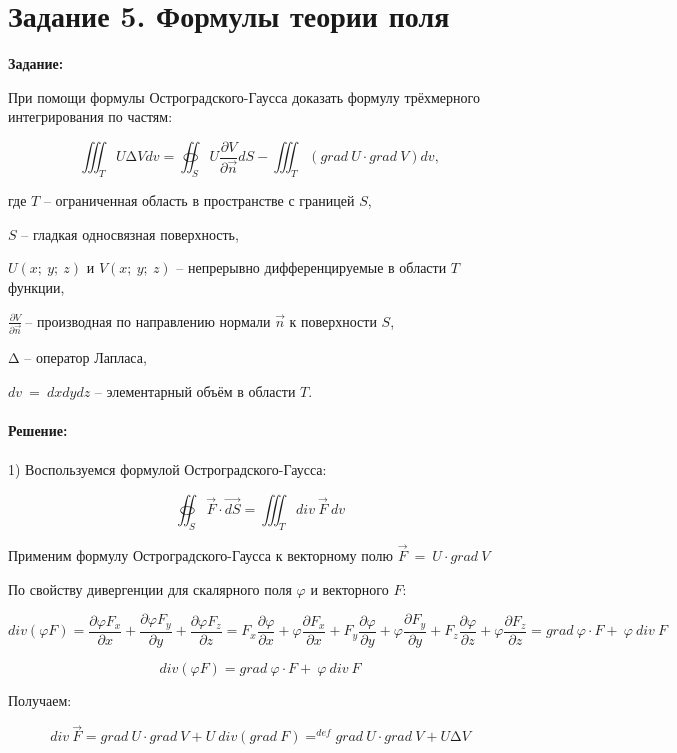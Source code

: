 \documentclass{article}
\begin{document}
\newpage
\section*{Задание 5. Формулы теории поля}
\textbf{
    Задание:
}

При помощи формулы Остроградского-Гаусса доказать формулу трёхмерного
интегрирования по частям:

\[\iiint_{T}^{\ }{U\mathrm{\Delta}V{dv}} = \oiint_{S}^{\ }{U\frac{\partial V}{\partial\overrightarrow{n}}dS} - \iiint_{T}^{\ }{(grad\ U \cdot grad\ V){dv}},\]

где \(T\) -- ограниченная область в пространстве с границей \(S\),

\(S\) -- гладкая односвязная поверхность,

\(U(x;\ y;\ z)\) и \(V(x;\ y;\ z)\) -- непрерывно дифференцируемые в
области \(T\) функции,

\(\frac{\partial V}{\partial\overrightarrow{n}}\ \)-- производная по
направлению нормали \(\overrightarrow{n}\) к поверхности \(S\),

\(\mathrm{\Delta}\) -- оператор Лапласа,

\(dv\  = \ dxdydz\) -- элементарный объём в области \(T\).
\\ \\
\textbf{
    Решение:
}\\ \\
1) Воспользуемся формулой Остроградского-Гаусса:

\[\oiint_{S}^{\ }{\overrightarrow{F} \cdot \overrightarrow{dS}} = \iiint_{T}^{\ }{div\ \overrightarrow{F}\ dv}\]

Применим формулу Остроградского-Гаусса к векторному полю
\(\overrightarrow{F}\  = \ U \cdot grad\ V\)

По свойству дивергенции для скалярного поля \(\varphi\) и векторного
\(F\):

\[div(\varphi F) = \frac{\partial\varphi F_{x}}{\partial x} + \frac{\partial\varphi F_{y}}{\partial y} + \frac{\partial\varphi F_{z}}{\partial z} = F_{x}\frac{\partial\varphi}{\partial x} + \varphi\frac{\partial F_{x}}{\partial x} + F_{y}\frac{\partial\varphi}{\partial y} + \varphi\frac{\partial F_{y}}{\partial y} + F_{z}\frac{\partial\varphi}{\partial z} + \varphi\frac{\partial F_{z}}{\partial z} = grad\ \varphi \cdot F + \ \varphi\ div\ F\]

\[div(\varphi F) = grad\ \varphi \cdot F + \ \varphi\ div\ F\]

Получаем:

\[div\ \overrightarrow{F} = grad\ U \cdot grad\ V + U\ div(grad\ F) =^{def} grad\ U \cdot grad\ V + U\mathrm{\Delta}V\]
\end{document}
